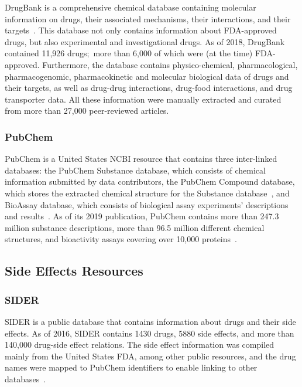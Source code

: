 DrugBank is a comprehensive chemical database containing molecular information on drugs, their associated mechanisms, their interactions, and their targets~\cite{wishart_drugbank_2018}.
This database not only contains information about \ac{FDA}-approved drugs, but also experimental and investigational drugs.
As of 2018, DrugBank contained 11,926 drugs;~more than 6,000 of which were (at the time) \ac{FDA}-approved.
Furthermore, the database contains physico-chemical, pharmacological, pharmacogenomic, pharmacokinetic and molecular biological data of drugs and their targets, as well as drug-drug interactions, drug-food interactions, and drug transporter data.
All these information were manually extracted and curated from more than 27,000 peer-reviewed articles.

\subsubsection{PubChem}

PubChem is a United States \ac{NCBI} resource that contains three inter-linked databases: the PubChem Substance database, which consists of chemical information submitted by data contributors, the PubChem Compound database, which stores the extracted chemical structure for the Substance database~\cite{kim_pubchem_2016}, and BioAssay database, which consists of biological assay experiments’ descriptions and results~\cite{kim_pubchem_2019}.
As of its 2019 publication, PubChem contains more than 247.3 million substance descriptions, more than 96.5 million different chemical structures, and bioactivity assays covering over 10,000 proteins~\cite{kim_pubchem_2019}.

\subsection{Side Effects Resources}

\subsubsection{SIDER}

\ac{SIDER} is a public database that contains information about drugs and their side effects.
As of 2016, \ac{SIDER} contains 1430 drugs, 5880 side effects, and more than 140,000 drug-side effect relations.
The side effect information was compiled mainly from the United States \ac{FDA}, among other public resources, and the drug names were mapped to PubChem identifiers to enable linking to other databases~\cite{kuhn_sider_2016}.

